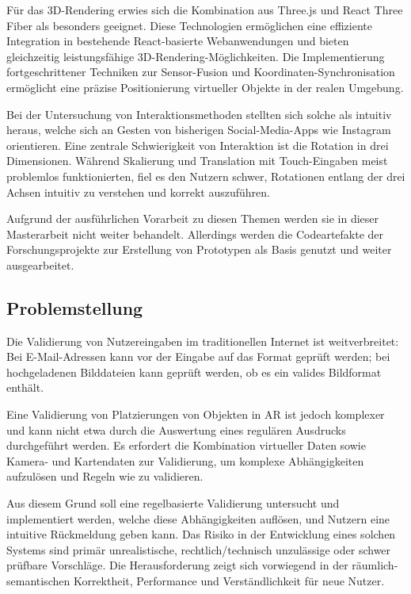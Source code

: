 Für das 3D-Rendering erwies sich die Kombination aus Three.js und React Three Fiber als besonders geeignet. Diese Technologien ermöglichen eine effiziente Integration in bestehende React-basierte Webanwendungen und bieten gleichzeitig leistungsfähige 3D-Rendering-Möglichkeiten. Die Implementierung fortgeschrittener Techniken zur Sensor-Fusion und Koordinaten-Synchronisation ermöglicht eine präzise Positionierung virtueller Objekte in der realen Umgebung. 

Bei der Untersuchung von Interaktionsmethoden stellten sich solche als intuitiv heraus, welche sich an Gesten von bisherigen Social-Media-Apps wie Instagram orientieren. Eine zentrale Schwierigkeit von Interaktion ist die Rotation in drei Dimensionen. Während Skalierung und Translation mit Touch-Eingaben meist problemlos funktionierten, fiel es den Nutzern schwer, Rotationen entlang der drei Achsen intuitiv zu verstehen und korrekt auszuführen.

\medskip

Aufgrund der ausführlichen Vorarbeit zu diesen Themen werden sie in dieser Masterarbeit nicht weiter behandelt. Allerdings werden die Codeartefakte der Forschungsprojekte zur Erstellung von Prototypen als Basis genutzt und weiter ausgearbeitet.

\subsection{Problemstellung}


Die Validierung von Nutzereingaben im traditionellen Internet ist weitverbreitet: Bei E-Mail-Adressen kann vor der Eingabe auf das Format  geprüft werden; bei hochgeladenen Bilddateien kann geprüft werden, ob es ein valides Bildformat enthält.

Eine Validierung von Platzierungen von Objekten in AR ist jedoch komplexer und kann nicht etwa durch die Auswertung eines regulären Ausdrucks durchgeführt werden. Es erfordert die Kombination virtueller Daten sowie Kamera- und Kartendaten zur Validierung, um komplexe Abhängigkeiten aufzulösen und Regeln wie  zu validieren.

Aus diesem Grund soll eine regelbasierte Validierung untersucht und implementiert werden, welche diese Abhängigkeiten auflösen, und Nutzern eine intuitive Rückmeldung geben kann. Das Risiko in der Entwicklung eines solchen Systems sind primär unrealistische, rechtlich/technisch unzulässige oder schwer prüfbare Vorschläge. Die Herausforderung zeigt sich vorwiegend in der räumlich-semantischen Korrektheit, Performance und Verständlichkeit für neue Nutzer.

